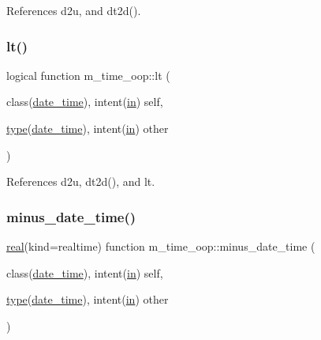 References d2u, and dt2d().

\mbox{\label{namespacem__time__oop_ab0c5ce86d25993804501d59a8106818f}} 
\subsubsection{\texorpdfstring{lt()}{lt()}}
{\footnotesize\ttfamily logical function m\+\_\+time\+\_\+oop\+::lt (\begin{DoxyParamCaption}\item[{class(\hyperlink{structm__time__oop_1_1date__time}{date\+\_\+time}), intent(\hyperlink{M__journal_83_8txt_afce72651d1eed785a2132bee863b2f38}{in})}]{self,  }\item[{\hyperlink{stop__watch_83_8txt_a70f0ead91c32e25323c03265aa302c1c}{type}(\hyperlink{structm__time__oop_1_1date__time}{date\+\_\+time}), intent(\hyperlink{M__journal_83_8txt_afce72651d1eed785a2132bee863b2f38}{in})}]{other }\end{DoxyParamCaption})\hspace{0.3cm}{\ttfamily [private]}}



References d2u, dt2d(), and lt.

\mbox{\label{namespacem__time__oop_a3da83a42a8f957db9bd2f6f0b942ab99}} 
\subsubsection{\texorpdfstring{minus\+\_\+date\+\_\+time()}{minus\_date\_time()}}
{\footnotesize\ttfamily \hyperlink{read__watch_83_8txt_abdb62bde002f38ef75f810d3a905a823}{real}(kind=realtime) function m\+\_\+time\+\_\+oop\+::minus\+\_\+date\+\_\+time (\begin{DoxyParamCaption}\item[{class(\hyperlink{structm__time__oop_1_1date__time}{date\+\_\+time}), intent(\hyperlink{M__journal_83_8txt_afce72651d1eed785a2132bee863b2f38}{in})}]{self,  }\item[{\hyperlink{stop__watch_83_8txt_a70f0ead91c32e25323c03265aa302c1c}{type}(\hyperlink{structm__time__oop_1_1date__time}{date\+\_\+time}), intent(\hyperlink{M__journal_83_8txt_afce72651d1eed785a2132bee863b2f38}{in})}]{other }\end{DoxyParamCaption})\hspace{0.3cm}{\ttfamily [private]}}



